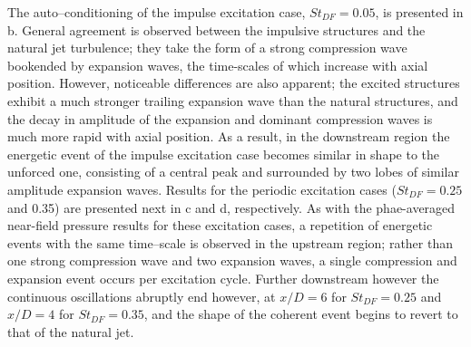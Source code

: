 The auto--conditioning of the impulse excitation case, $St_{DF} = 0.05$, is presented in b.
General agreement is observed between the impulsive structures and the natural jet turbulence; they take the form of a strong compression wave bookended by expansion waves, the time-scales of which increase with axial position.
However, noticeable differences are also apparent; the excited structures exhibit a much stronger trailing expansion wave than the natural structures, and the decay in amplitude of the expansion and dominant compression waves is much more rapid with axial position.
As a result, in the downstream region the energetic event of the impulse excitation case becomes similar in shape to the unforced one, consisting of a central peak and surrounded by two lobes of similar amplitude expansion waves.
Results for the periodic excitation cases ($St_{DF} = 0.25$ and 0.35) are presented next in c and d, respectively.
As with the phae-averaged near-field pressure results for these excitation cases, a repetition of energetic events with the same time--scale is observed in the upstream region; rather than one strong compression wave and two expansion waves, a single compression and expansion event occurs per excitation cycle.
Further downstream however the continuous oscillations abruptly end however, at $x/D = 6$ for $St_{DF} =0.25$ and $x/D = 4$ for $St_{DF} =0.35$, and the shape of the coherent event begins to revert to that of the natural jet.

